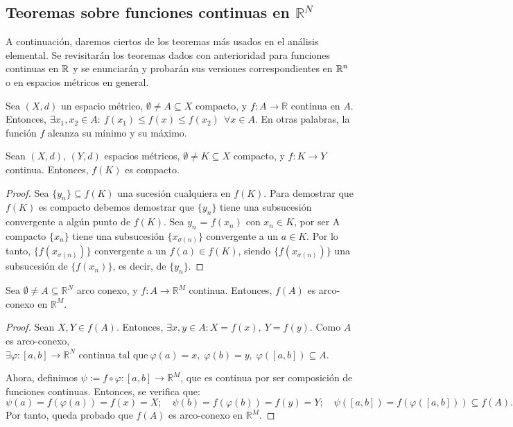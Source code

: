 \subsection{Teoremas sobre funciones continuas en $\mathbb{R}^N$}

A continuación, daremos ciertos de los teoremas más usados en el análisis elemental. Se revisitarán los teoremas dados con anterioridad para funciones continuas en $\mathbb{R}$ y se enunciarán y probarán sus versiones correspondientes en $\mathbb{R}^n$ o en espacios métricos en general.



\begin{nth}[Weierstrass]
Sea $(X,d)$ un espacio métrico, $\emptyset \ne A \subseteq X$ compacto, y $f:A \longrightarrow \mathbb{R}$ continua en $A$. Entonces, $\exists x_1,x_2 \in A: \ f(x_1)\le f(x) \le f(x_2)\ \ \forall x\in A$. En otras palabras, la función $f$ alcanza su mínimo y su máximo.
\end{nth}

\begin{nth}
Sean $(X,d)$, $(Y,d)$ espacios métricos, $\emptyset \ne K \subseteq X$ compacto, y $f: K \longrightarrow Y$ continua. Entonces, $f(K)$ es compacto.
\end{nth}
\begin{proof}
		Sea $\{y_n\}\subseteq f(K)$ una sucesión cualquiera en $f(K)$. Para demostrar que $f(K)$ es compacto debemos demostrar que $\{y_n\}$ tiene una subsucesión convergente a algún punto de $f(K)$. Sea $y_n$ = $f(x_n)$ con $x_n \in K$, por ser A compacto $\{x_n\}$ tiene una subsucesión $\{x_{\sigma(n)}\}$ convergente a un $a \in K$. Por lo tanto, $\{f(x_{\sigma(n)})\}$ convergente a un $f(a) \in f(K)$, siendo $\{f(x_{\sigma(n)})\}$ una subsucesión de $\{f(x_{n})\}$, es decir, de $\{y_n\}$.
\end{proof}



\begin{nth}
Sea $\emptyset \ne A \subseteq \mathbb{R}^N$ arco conexo, y $f: A \longrightarrow \mathbb{R}^M$ continua. Entonces, $f(A)$ es arco-conexo en $\mathbb{R}^M$.
\end{nth}

\begin{proof}
Sean $X,Y\in f(A)$. Entonces, $\exists x,y \in A : X=f(x), \ Y=f(y)$. Como $A$ es arco-conexo, $\exists\varphi : [a,b]\longrightarrow \mathbb{R}^N \text{ continua tal que}\ \varphi(a) = x,\; \varphi(b)=y,\; \varphi([a,b]) \subseteq A$.


Ahora, definimos $\psi := f\circ \varphi : [a,b] \longrightarrow \mathbb{R}^M$, que es continua por ser composición de funciones continuas. Entonces, se verifica que: $$\psi(a) = f(\varphi(a)) = f(x) = X;\quad \psi(b)= f(\varphi(b)) = f(y) = Y;\quad \psi([a,b]) = f(\varphi([a,b])) \subseteq f(A).$$
Por tanto, queda probado que $f(A)$ es arco-conexo en $\mathbb{R}^M$.
\end{proof}



